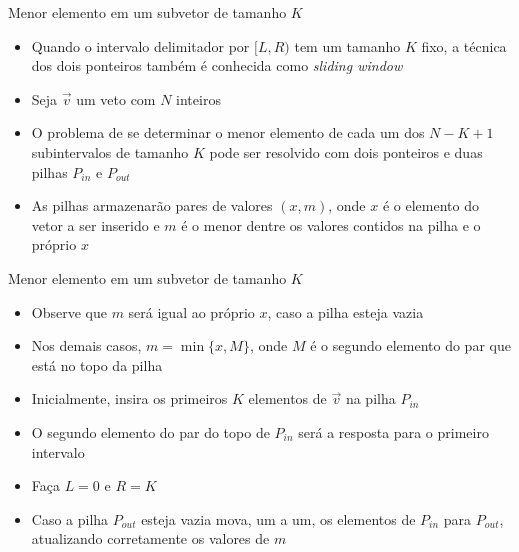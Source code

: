 \begin{frame}[fragile]{Menor elemento em um subvetor de tamanho $K$}

    \begin{itemize}
        \item Quando o intervalo delimitador por $[L, R)$ tem um tamanho $K$ fixo, a técnica dos
            dois ponteiros também é conhecida como \textit{sliding window}

        \item Seja $\vec{v}$ um veto com $N$ inteiros

        \item O problema de se determinar o menor elemento de cada um dos $N - K + 1$ subintervalos
            de tamanho $K$ pode ser resolvido com dois ponteiros e duas pilhas $P_{in}$ e 
            $P_{out}$

        \item As pilhas armazenarão pares de valores $(x, m)$, onde $x$ é o elemento do vetor a
            ser inserido e $m$ é o menor dentre os valores contidos na pilha e o próprio $x$
    \end{itemize}

\end{frame}

\begin{frame}[fragile]{Menor elemento em um subvetor de tamanho $K$}

    \begin{itemize}
        \item Observe que $m$ será igual ao próprio $x$, caso a pilha esteja vazia

        \item Nos demais casos, $m = \min\{ x, M \}$, onde $M$ é o segundo elemento do par que
            está no topo da pilha

        \item Inicialmente, insira os primeiros $K$ elementos de $\vec{v}$ na pilha $P_{in}$

        \item O segundo elemento do par do topo de $P_{in}$ será a resposta para o primeiro 
            intervalo

        \item Faça $L = 0$ e $R = K$

        \item Caso a pilha $P_{out}$ esteja vazia mova, um a um, os elementos de $P_{in}$ para
            $P_{out}$, atualizando corretamente os valores de $m$

    \end{itemize}

\end{frame}

